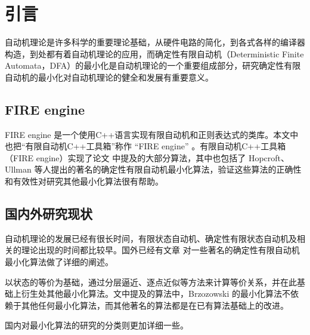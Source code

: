 \chapter{引言}
自动机理论是许多科学的重要理论基础，从硬件电路的简化，到各式各样的编译器构造，到处都有着自动机理论的应用，而确定性有限自动机（Deterministic Finite Automata，DFA）的最小化是自动机理论的一个重要组成部分，研究确定性有限自动机的最小化对自动机理论的健全和发展有重要意义。

\section{FIRE engine}
FIRE engine \cite{watson1994design}是一个使用C++语言实现有限自动机和正则表达式的类库。本文中也把“有限自动机C++工具箱”称作 “FIRE engine” 。有限自动机C++工具箱（FIRE engine）实现了论文 \cite{watson1993taxonomya,watson1993taxonomyb} 中提及的大部分算法，其中也包括了 Hopcroft、Ullman 等人提出的著名的确定性有限自动机最小化算法，验证这些算法的正确性和有效性对研究其他最小化算法很有帮助。

\section{国内外研究现状}

自动机理论的发展已经有很长时间，有限状态自动机、确定性有限状态自动机及相关的理论出现的时间都比较早。国外已经有文章 \cite{watson1993taxonomyb} 对一些著名的确定性有限自动机最小化算法做了详细的阐述。

以状态的等价为基础，通过分层逼近、逐点近似等方法来计算等价关系，并在此基础上衍生处其他最小化算法。文中提及的算法中，Brzozowski 的最小化算法不依赖于其他任何最小化算法，而其他著名的算法都是在已有算法基础上的改进\cite{watson1993taxonomyb}。

国内对最小化算法的研究的分类则更加详细一些。